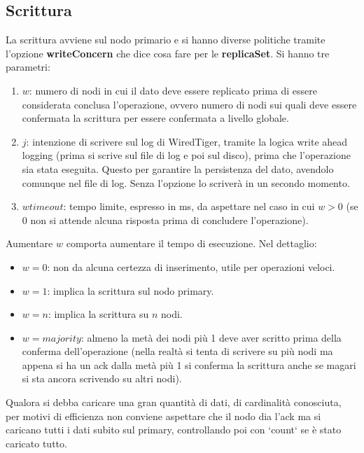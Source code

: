 \subsection{Scrittura}
La scrittura avviene sul nodo primario e si hanno diverse politiche tramite l’opzione \textbf{writeConcern} che dice cosa fare per le \textbf{replicaSet}. 
Si hanno tre parametri:
\begin{enumerate}
    \item $w$: numero di nodi in cui il dato deve essere replicato prima di essere considerata conclusa l’operazione, ovvero numero di nodi sui quali deve essere confermata la scrittura per essere confermata a livello globale.
    \item $j$: intenzione di scrivere sul log di WiredTiger, tramite la logica write ahead logging (prima si scrive sul file di log e poi sul disco), prima che l’operazione sia stata eseguita. Questo per garantire la persistenza del dato, avendolo comunque nel file di log. Senza l’opzione lo scriverà in un secondo momento.
    \item $wtimeout$: tempo limite, espresso in ms, da aspettare nel caso in cui $w>0$ (se $0$ non si attende alcuna risposta prima di concludere l’operazione).
\end{enumerate}
Aumentare $w$ comporta aumentare il tempo di esecuzione. Nel dettaglio:
\begin{itemize}
    \item $w=0$: non da alcuna certezza di inserimento, utile per operazioni veloci.
    \item $w=1$: implica la scrittura sul nodo primary.
    \item $w=n$: implica la scrittura su $n$ nodi.
    \item $w=majority$: almeno la metà dei nodi più 1 deve aver scritto prima della conferma dell’operazione (nella realtà si tenta di scrivere su più nodi ma appena si ha un ack dalla metà più 1 si conferma la scrittura anche se magari si sta ancora scrivendo su altri nodi).
\end{itemize}
Qualora si debba caricare una gran quantità di dati, di cardinalità conosciuta, per motivi di efficienza non conviene aspettare che il nodo dia l’ack ma si caricano tutti i dati subito sul primary, controllando poi con `count` se è stato caricato tutto.

